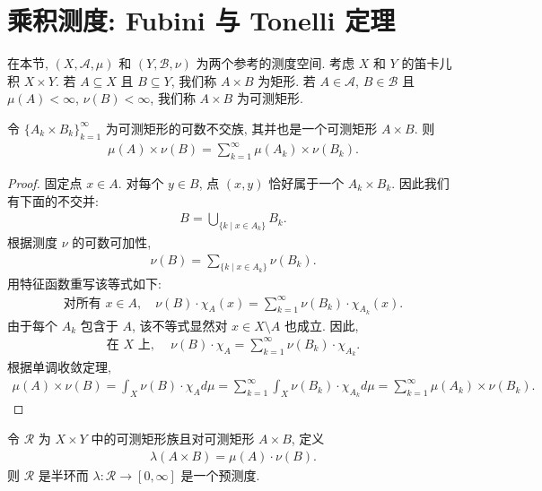 \documentclass[../../main.tex]{subfiles}
\begin{document}
\section{乘积测度: Fubini 与 Tonelli 定理}\label{section:ch20-乘积测度}

在本节, $(X,\mathcal{A},\mu)$ 和 $(Y,\mathcal{B},\nu)$ 为两个参考的测度空间. 考虑 $X$ 和 $Y$ 的笛卡儿积 $X\times Y$. 若 $A\subseteq X$ 且 $B\subseteq Y$, 我们称 $A\times B$ 为矩形. 若 $A\in\mathcal{A}$, $B\in\mathcal{B}$ 且 $\mu(A)<\infty$, $\nu(B)<\infty$, 我们称 $A\times B$ 为可测矩形.

\begin{lemma}\label{lemma:ch20-矩形不交并}
令 $\{A_{k}\times B_{k}\}_{k=1}^{\infty}$ 为可测矩形的可数不交族, 其并也是一个可测矩形 $A\times B$. 则
\begin{align*}
\mu(A)\times\nu(B)=\sum_{k=1}^{\infty}\mu(A_{k})\times\nu(B_{k}).
\end{align*}
\end{lemma}

\begin{proof}
固定点 $x\in A$. 对每个 $y\in B$, 点 $(x,y)$ 恰好属于一个 $A_{k}\times B_{k}$. 因此我们有下面的不交并:
\begin{align*}
B=\bigcup_{\{k\mid x\in A_{k}\}}B_{k}.
\end{align*}
根据测度 $\nu$ 的可数可加性,
\begin{align*}
\nu(B)=\sum_{\{k\mid x\in A_{k}\}}\nu(B_{k}).
\end{align*}
用特征函数重写该等式如下:
\begin{align*}
\text{对所有 }x\in A,\quad\nu(B)\cdot\chi_{A}(x)=\sum_{k=1}^{\infty}\nu(B_{k})\cdot\chi_{A_{k}}(x).
\end{align*}
由于每个 $A_{k}$ 包含于 $A$, 该不等式显然对 $x\in X\setminus A$ 也成立. 因此,
\begin{align*}
\text{在 }X\text{ 上, }\quad\nu(B)\cdot\chi_{A}=\sum_{k=1}^{\infty}\nu(B_{k})\cdot\chi_{A_{k}}.
\end{align*}
根据单调收敛定理,
\begin{align*}
\mu(A)\times\nu(B)=\int_{X}\nu(B)\cdot\chi_{A}d\mu=\sum_{k=1}^{\infty}\int_{X}\nu(B_{k})\cdot\chi_{A_{k}}d\mu=\sum_{k=1}^{\infty}\mu(A_{k})\times\nu(B_{k}).
\end{align*}
\end{proof}

\begin{proposition}\label{proposition:ch20-预测度}
令 $\mathcal{R}$ 为 $X\times Y$ 中的可测矩形族且对可测矩形 $A\times B$, 定义
\begin{align*}
\lambda(A\times B)=\mu(A)\cdot\nu(B).
\end{align*}
则 $\mathcal{R}$ 是半环而 $\lambda:\mathcal{R}\to[0,\infty]$ 是一个预测度.
\end{proposition}
\end{document}
